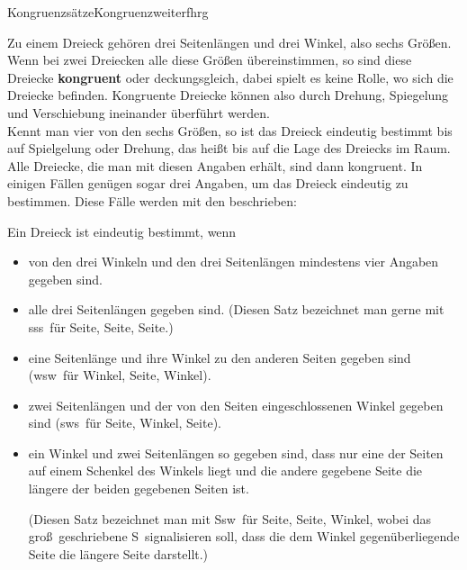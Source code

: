 \begin{MXContent}{Kongruenzs\"atze}{Kongruenz}{weiterfhrg}

Zu einem Dreieck geh\"oren drei Seitenl\"angen und drei Winkel, also sechs Gr\"o\ss en. Wenn bei zwei Dreiecken alle diese Gr\"o\ss en \"ubereinstimmen, so sind diese Dreiecke \textbf{kongruent} oder deckungsgleich, dabei spielt es keine Rolle, wo sich die Dreiecke befinden. Kongruente Dreiecke k\"onnen also durch Drehung, Spiegelung und Verschiebung ineinander \"uberf\"uhrt werden.\\
Kennt man vier von den sechs Gr\"o\ss en, so ist das Dreieck eindeutig bestimmt bis auf Spielgelung oder Drehung, das hei\ss t bis auf die Lage des Dreiecks im Raum. Alle Dreiecke, die man mit diesen Angaben erh\"alt, sind dann kongruent. In einigen F\"allen gen\"ugen sogar drei Angaben, um das Dreieck eindeutig zu bestimmen.
Diese F\"alle werden mit den  beschrieben:

\begin{MInfo}%
Ein Dreieck ist eindeutig bestimmt, wenn
\begin{itemize}
 \item von den drei Winkeln und den drei Seitenl\"angen
       mindestens vier Angaben gegeben sind.
 
 \item alle drei Seitenl\"angen gegeben sind.
       (Diesen Satz bezeichnet man gerne mit \glqq sss\grqq\ f\"ur \glqq Seite, Seite, Seite\grqq.)
 
 \item eine Seitenl\"ange und ihre Winkel zu den anderen Seiten gegeben
       sind (\glqq wsw\grqq\ f\"ur \glqq Winkel, Seite, Winkel\grqq).
        
 \item zwei Seitenl\"angen und der von den Seiten eingeschlossenen
       Winkel gegeben sind (\glqq sws\grqq\ f\"ur \glqq Seite, Winkel, Seite\grqq).
       
             
 \item ein Winkel und zwei Seitenl\"angen so gegeben sind,
       dass nur eine der Seiten auf einem Schenkel des Winkels liegt und die andere gegebene Seite die l\"angere der beiden gegebenen Seiten ist.
       
       (Diesen Satz bezeichnet man mit \glqq Ssw\grqq\ f\"ur \glqq Seite, Seite, Winkel\grqq,
        wobei das gro\ss\ geschriebene \glqq S\grqq\ signalisieren soll, dass die
        dem Winkel gegen\"uberliegende Seite die l\"angere Seite darstellt.)
\end{itemize}
\end{MInfo}
 

\end{MXContent}
